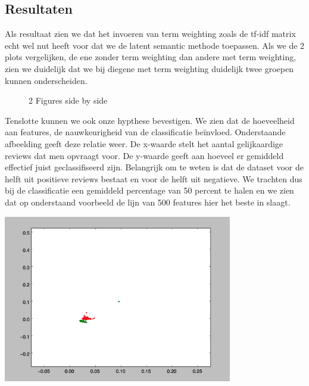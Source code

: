 \subsection{Resultaten}\label{Resultaten}

Als resultaat zien we dat het invoeren van term weighting zoals de tf-idf matrix echt wel nut heeft voor dat we de latent semantic methode toepassen.
Als we de 2 plots vergelijken, de ene zonder term weighting dan andere met term weighting, zien we duidelijk dat we bij diegene met term weighting duidelijk twee groepen kunnen onderscheiden.

\begin{figure}%
    \centering
    \qquad
    \caption{2 Figures side by side}%
    \label{fig:example}%
\end{figure}

Tenslotte kunnen we ook onze hypthese bevestigen. We zien dat de hoeveelheid aan features, de nauwkeurigheid van de classificatie beïnvloed. Onderstaande afbeelding geeft deze relatie weer. De x-waarde stelt het aantal gelijkaardige reviews dat men opvraagt voor. De y-waarde geeft aan hoeveel er gemiddeld effectief juist geclassifiseerd zijn. Belangrijk om te weten is dat de dataset voor de helft uit positieve reviews bestaat en voor de helft uit negatieve. We trachten dus bij de classificatie een gemiddeld percentage van 50 percent te halen en we zien dat op onderstaand voorbeeld de lijn van 500 features hier het beste in slaagt.


\begin{center}
  \includegraphics[width=10cm]{experiment_1}
\end{center}
